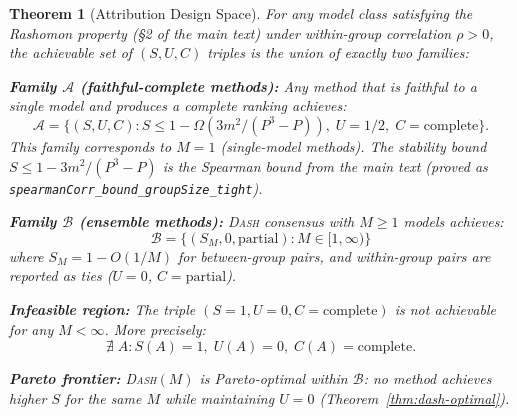 \documentclass{article}
\newcommand{\DASH}{\textsc{Dash}}
\newtheorem{theorem}{Theorem}
\begin{document}
\begin{theorem}[Attribution Design Space]
\label{thm:design-space}
For any model class satisfying the Rashomon property (\S2 of the main text)
under within-group correlation $\rho > 0$, the achievable set of
$(S, U, C)$ triples is the union of exactly two families:

\textbf{Family $\mathcal{A}$ (faithful-complete methods):}
Any method that is faithful to a single model and produces a
complete ranking achieves:
\begin{equation}
\label{eq:family-a}
    \mathcal{A} = \big\{(S, U, C) :
    S \leq 1 - \Omega(3m^2/(P^3{-}P)),\;
    U = 1/2,\;
    C = \text{complete}\big\}.
\end{equation}
This family corresponds to $M = 1$ (single-model methods).
The stability bound $S \leq 1 - 3m^2/(P^3{-}P)$ is the Spearman bound
from the main text (proved as \texttt{spearmanCorr\_bound\_groupSize\_tight}).

\textbf{Family $\mathcal{B}$ (ensemble methods):}
\DASH{} consensus with $M \geq 1$ models achieves:
\begin{equation}
\label{eq:family-b}
    \mathcal{B} = \big\{(S_M, 0, \text{partial}) : M \in [1, \infty)\big\}
\end{equation}
where $S_M = 1 - O(1/M)$ for between-group pairs, and within-group
pairs are reported as ties ($U = 0$, $C = \text{partial}$).

\textbf{Infeasible region:}
The triple $(S = 1, U = 0, C = \text{complete})$ is not achievable
for any $M < \infty$. More precisely:
\begin{equation}
\label{eq:infeasible}
    \nexists\; A : S(A) = 1,\; U(A) = 0,\; C(A) = \text{complete}.
\end{equation}

\textbf{Pareto frontier:}
\DASH{}$(M)$ is Pareto-optimal within $\mathcal{B}$: no method achieves
higher $S$ for the same $M$ while maintaining $U = 0$
(Theorem~\ref{thm:dash-optimal}).
\end{theorem}
\end{document}
